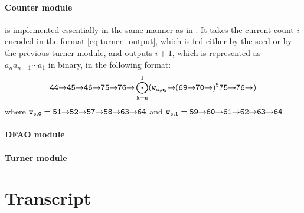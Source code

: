 \documentclass[runningheads]{llncs}
\newcommand{\east}{{\ensuremath \to}}
\begin{document}
\paragraph{Counter module} is implemented essentially in the same manner as in \cite{GeMeScSe2016}. 
It takes the current count $i$ encoded in the format \eqref{eq:turner_output}, which is fed either by the seed or by the previous turner module, and outputs $i+1$, which is represented as $a_n a_{n-1} \cdots a_1$ in binary, in the following format:
\begin{equation}\label{eq:counter_output}{\tt 
	44 \east 45 \east 46 \east 75 \east 76 \east \bigodot_{k = n}^1 (w_{c, a_k} \east (69 \east 70 \east)^5 75 \east 76 \east)
}\end{equation}
where ${\tt w_{c, 0} = 51 \east 52 \east 57 \east 58 \east 63 \east 64}$ and ${\tt w_{c, 1} = 59 \east 60 \east 61 \east 62 \east 63 \east 64}$. 

\paragraph{DFAO module}

\paragraph{Turner module}

	
	

	\newpage
	\appendix

	\section{Transcript}
\end{document}
